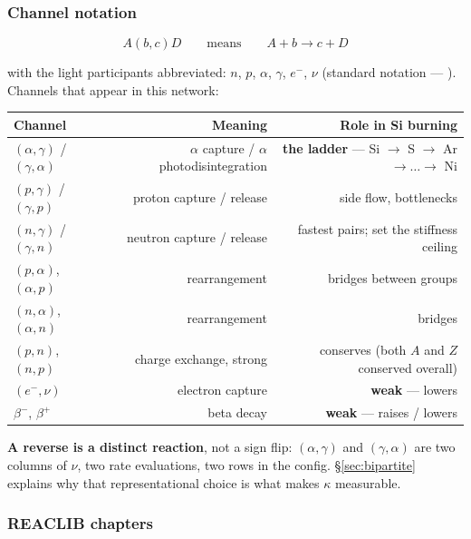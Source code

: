 \subsubsection{Channel notation}
\label{sec:channelnotation}

\begin{equation*}
A(b,c)D \qquad \text{means} \qquad A + b \to c + D
\end{equation*}

with the light participants abbreviated: $n$, $p$, $\alpha$, $\gamma$, $e^-$,
$\nu$ (standard notation --- \citealt{jose2011}). Channels that appear in this
network:

\begin{center}
\small
\begin{tabularx}{\textwidth}{@{}l R{0.864} R{1.136}@{}}
\toprule
\textbf{Channel} & \textbf{Meaning} & \textbf{Role in Si burning} \\
\midrule
$(\alpha,\gamma)$ / $(\gamma,\alpha)$ &
  $\alpha$ capture / $\alpha$ photodisintegration &
  \textbf{the ladder} --- Si $\to$ S $\to$ Ar $\to \ldots \to$ Ni \\
$(p,\gamma)$ / $(\gamma,p)$ & proton capture / release &
  side flow, bottlenecks \\
$(n,\gamma)$ / $(\gamma,n)$ & neutron capture / release &
  fastest pairs; set the stiffness ceiling \\
$(p,\alpha)$, $(\alpha,p)$ & rearrangement & bridges between groups \\
$(n,\alpha)$, $(\alpha,n)$ & rearrangement & bridges \\
$(p,n)$, $(n,p)$ & charge exchange, strong &
  conserves \Ye{} (both $A$ and $Z$ conserved overall) \\
$(e^-,\nu)$ & electron capture & \textbf{weak} --- lowers \Ye{} \\
$\beta^-$, $\beta^+$ & beta decay &
  \textbf{weak} --- raises / lowers \Ye{} \\
\bottomrule
\end{tabularx}
\end{center}

\textbf{A reverse is a distinct reaction}, not a sign flip: $(\alpha,\gamma)$
and $(\gamma,\alpha)$ are two columns of $\nu$, two rate evaluations, two rows
in the config. \S\ref{sec:bipartite} explains why that representational choice
is what makes $\kappa$ measurable.

\subsubsection{REACLIB chapters}
\label{sec:reaclibchapters}


